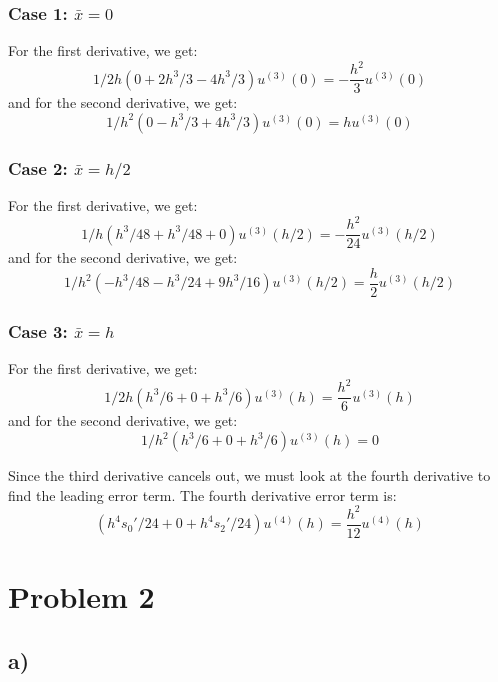 \documentclass{article}
\begin{document}
\subsubsection*{Case 1: $\bar x=0$}
For the first derivative, we get:
\begin{equation}
1/2h(0+2h^3/3-4h^3/3)u^{(3)}(0)=\boxed{-\frac{h^2}{3}u^{(3)}(0)}
\end{equation}
and for the second derivative, we get:
\begin{equation}
1/h^2(0-h^3/3+4h^3/3)u^{(3)}(0)=\boxed{hu^{(3)}(0)}
\end{equation}

\subsubsection*{Case 2: $\bar x=h/2$}
For the first derivative, we get:
\begin{equation}
1/h(h^3/48+h^3/48+0)u^{(3)}(h/2)=\boxed{-\frac{h^2}{24}u^{(3)}(h/2)}
\end{equation}
and for the second derivative, we get:
\begin{equation}
1/h^2(-h^3/48-h^3/24+9h^3/16)u^{(3)}(h/2)=\boxed{\frac{h}{2}u^{(3)}(h/2)}
\end{equation}

\subsubsection*{Case 3: $\bar x=h$}
For the first derivative, we get:
\begin{equation}
1/2h(h^3/6+0+h^3/6)u^{(3)}(h)=\boxed{\frac{h^2}{6}u^{(3)}(h)}
\end{equation}
and for the second derivative, we get:
\begin{equation}
1/h^2(h^3/6+0+h^3/6)u^{(3)}(h)=0
\end{equation}

Since the third derivative cancels out, we must look at the fourth derivative to find the leading error term. The fourth derivative error term is:
\begin{equation}
(h^4s_0'/24+0+h^4s_2'/24)u^{(4)}(h)=\boxed{\frac{h^2}{12}u^{(4)}(h)}
\end{equation}
\section*{Problem 2}
\subsection*{a)}
\end{document}
